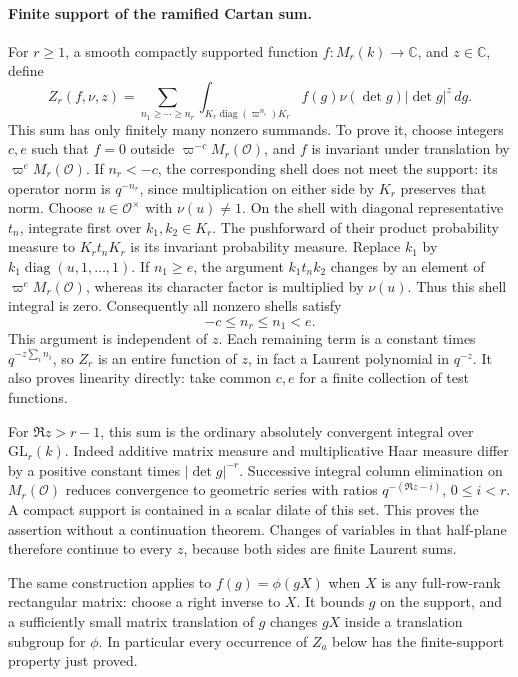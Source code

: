 \paragraph{Finite support of the ramified Cartan sum.}
For \(r\ge1\), a smooth compactly supported function
\(f:M_r(k)\to\mathbb C\), and \(z\in\mathbb C\), define
\[
 Z_r(f,\nu,z)=
 \sum_{n_1\ge\cdots\ge n_r}
 \int_{K_r\operatorname{diag}(\varpi^{n_i})K_r}
              f(g)\nu(\det g)|\det g|^z\,dg .
\]
This sum has only finitely many nonzero summands.  To prove it,
choose integers \(c,e\) such that \(f=0\) outside
\(\varpi^{-c}M_r(\mathcal O)\), and \(f\) is invariant under
translation by \(\varpi^eM_r(\mathcal O)\).  If \(n_r<-c\),
the corresponding shell does not meet the support: its operator
norm is \(q^{-n_r}\), since multiplication on either side by
\(K_r\) preserves that norm.  Choose
\(u\in\mathcal O^\times\) with \(\nu(u)\ne1\).  On the shell
with diagonal representative \(t_n\), integrate first over
\(k_1,k_2\in K_r\).  The pushforward of their product probability
measure to \(K_rt_nK_r\) is its invariant probability measure.
Replace \(k_1\) by
\(k_1\operatorname{diag}(u,1,\ldots,1)\).  If \(n_1\ge e\),
the argument \(k_1t_nk_2\) changes by an element of
\(\varpi^eM_r(\mathcal O)\), whereas its character factor is
multiplied by \(\nu(u)\).  Thus this shell integral is zero.
Consequently all nonzero shells satisfy
\[
                       -c\le n_r\le n_1<e.
\]
This argument is independent of \(z\).  Each remaining term is
a constant times \(q^{-z\sum_i n_i}\), so \(Z_r\) is an entire
function of \(z\), in fact a Laurent polynomial in \(q^{-z}\).
It also proves linearity directly: take common \(c,e\) for a
finite collection of test functions.

For \(\Re z>r-1\), this sum is the ordinary absolutely convergent
integral over \(\mathrm{GL}_r(k)\).  Indeed additive matrix measure
and multiplicative Haar measure differ by a positive constant
times \(|\det g|^{-r}\).  Successive integral column elimination
on \(M_r(\mathcal O)\) reduces convergence to geometric series
with ratios \(q^{-(\Re z-i)}\), \(0\le i<r\).
A compact support is contained in a scalar dilate of this set.
This proves the assertion without a continuation theorem.
Changes of variables in that half-plane therefore continue to
every \(z\), because both sides are finite Laurent sums.

The same construction applies to \(f(g)=\phi(gX)\) when \(X\)
is any full-row-rank rectangular matrix: choose a right inverse
to \(X\).  It bounds \(g\) on the support, and a sufficiently
small matrix translation of \(g\) changes \(gX\) inside a
translation subgroup for \(\phi\).  In particular every occurrence
of \(Z_a\) below has the finite-support property just proved.

